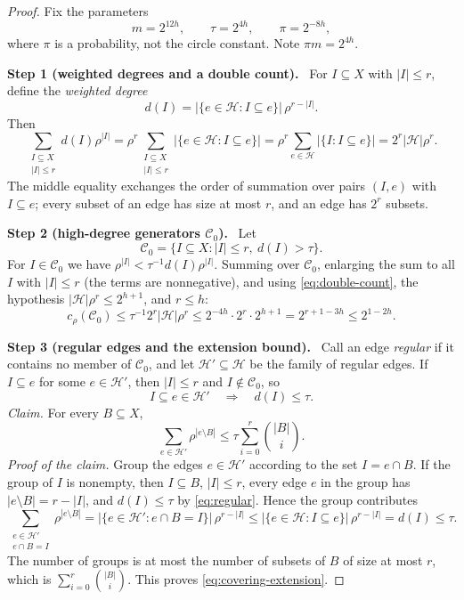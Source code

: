 \documentclass[11pt,letterpaper]{article}
\theoremstyle{definition}
\theoremstyle{remark}
\numberwithin{equation}{section}
\newcommand{\step}[1]{\par\medskip\noindent\textbf{#1}\ }
\begin{document}
\begin{proof}
Fix the parameters
\[
m=2^{12h},\qquad \tau=2^{4h},\qquad \pi=2^{-8h},
\]
where $\pi$ is a probability, not the circle constant. Note
$\pi m=2^{4h}$.

\step{Step 1 (weighted degrees and a double count).}
For \(I\subseteq X\) with \(|I|\le r\), define the \emph{weighted degree}
\[
d(I)=|\{e\in\mathcal H:I\subseteq e\}|\,\rho^{r-|I|}.
\]
Then
\begin{equation}\label{eq:double-count}
\sum_{\substack{I\subseteq X\\|I|\le r}}d(I)\rho^{|I|}
=\rho^r\sum_{\substack{I\subseteq X\\|I|\le r}}
   |\{e\in\mathcal H:I\subseteq e\}|
=\rho^r\sum_{e\in\mathcal H}|\{I:I\subseteq e\}|
=2^r|\mathcal H|\rho^r .
\end{equation}
The middle equality exchanges the order of summation over pairs $(I,e)$
with $I\subseteq e$; every subset of an edge has size at most $r$, and an
edge has $2^r$ subsets.

\step{Step 2 (high-degree generators $\mathcal C_0$).}
Let
\[
\mathcal C_0=\{I\subseteq X:|I|\le r,\ d(I)>\tau\}.
\]
For $I\in\mathcal C_0$ we have $\rho^{|I|}<\tau^{-1}d(I)\rho^{|I|}$.
Summing over $\mathcal C_0$, enlarging the sum to all $I$ with $|I|\le r$
(the terms are nonnegative), and using \eqref{eq:double-count}, the
hypothesis $|\mathcal H|\rho^r\le2^{h+1}$, and $r\le h$:
\begin{equation}\label{eq:covering-initial-cost}
c_\rho(\mathcal C_0)
\le \tau^{-1}2^r|\mathcal H|\rho^r
\le 2^{-4h}\cdot2^{r}\cdot2^{h+1}
=2^{r+1-3h}\le2^{1-2h}.
\end{equation}

\step{Step 3 (regular edges and the extension bound).}
Call an edge \emph{regular} if it contains no member of \(\mathcal C_0\),
and let \(\mathcal H'\subseteq\mathcal H\) be the family of regular edges.
If $I\subseteq e$ for some $e\in\mathcal H'$, then $|I|\le r$ and
$I\notin\mathcal C_0$, so
\begin{equation}\label{eq:regular}
I\subseteq e\in\mathcal H'
\quad\Longrightarrow\quad d(I)\le \tau.
\end{equation}
\emph{Claim.} For every \(B\subseteq X\),
\begin{equation}\label{eq:covering-extension}
\sum_{e\in\mathcal H'}\rho^{|e\setminus B|}
\le \tau\sum_{i=0}^r\binom{|B|}{i}.
\end{equation}
\emph{Proof of the claim.} Group the edges \(e\in\mathcal H'\) according to
the set \(I=e\cap B\). If the group of $I$ is nonempty, then $I\subseteq B$,
$|I|\le r$, every edge $e$ in the group has $|e\setminus B|=r-|I|$, and
$d(I)\le\tau$ by \eqref{eq:regular}. Hence the group contributes
\[
\sum_{\substack{e\in\mathcal H'\\e\cap B=I}}
  \rho^{|e\setminus B|}
=|\{e\in\mathcal H':e\cap B=I\}|\,\rho^{r-|I|}
\le|\{e\in\mathcal H:I\subseteq e\}|\,\rho^{r-|I|}
= d(I)\le \tau.
\]
The number of groups is at most the number of subsets of $B$ of size at most
$r$, which is $\sum_{i=0}^r\binom{|B|}{i}$. This proves
\eqref{eq:covering-extension}.


\end{proof}
\end{document}

